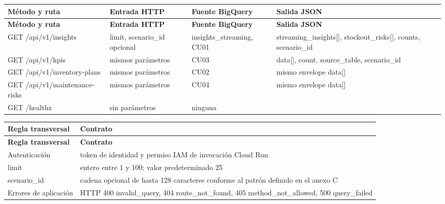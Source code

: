 \documentclass[11pt]{article}
\begin{document}
\begingroup\small
\begin{longtable}{@{}>{\raggedright\arraybackslash}p{}>{\raggedright\arraybackslash}p{}>{\raggedright\arraybackslash}p{}>{\raggedright\arraybackslash}p{}@{}}
\toprule
\textbf{Método y ruta} & \textbf{Entrada HTTP} & \textbf{Fuente BigQuery} & \textbf{Salida JSON} \\
\midrule
\endfirsthead
\toprule
\textbf{Método y ruta} & \textbf{Entrada HTTP} & \textbf{Fuente BigQuery} & \textbf{Salida JSON} \\
\midrule
\endhead
GET /api/\allowbreak{}v1/\allowbreak{}insights & limit, scenario\_\allowbreak{}id opcional & insights\_\allowbreak{}streaming, CU01 & streaming\_\allowbreak{}insights[], stockout\_\allowbreak{}risks[], counts, scenario\_\allowbreak{}id \\
GET /api/\allowbreak{}v1/\allowbreak{}kpis & mismos parámetros & CU03 & data[], count, source\_\allowbreak{}table, scenario\_\allowbreak{}id \\
GET /api/\allowbreak{}v1/\allowbreak{}inventory-plans & mismos parámetros & CU02 & mismo envelope data[] \\
GET /api/\allowbreak{}v1/\allowbreak{}maintenance-risks & mismos parámetros & CU04 & mismo envelope data[] \\
GET /healthz & sin parámetros & ninguna & [''status'':''ok''] \\
\bottomrule
\end{longtable}
\endgroup

\begingroup\small
\begin{longtable}{@{}>{\raggedright\arraybackslash}p{}>{\raggedright\arraybackslash}p{}@{}}
\toprule
\textbf{Regla transversal} & \textbf{Contrato} \\
\midrule
\endfirsthead
\toprule
\textbf{Regla transversal} & \textbf{Contrato} \\
\midrule
\endhead
Autenticación & token de identidad y permiso IAM de invocación Cloud Run \\
limit & entero entre 1 y 100; valor predeterminado 25 \\
scenario\_\allowbreak{}id & cadena opcional de hasta 128 caracteres conforme al patrón definido en el anexo C \\
Errores de aplicación & HTTP 400 invalid\_\allowbreak{}query, 404 route\_\allowbreak{}not\_\allowbreak{}found, 405 method\_\allowbreak{}not\_\allowbreak{}allowed, 500 query\_\allowbreak{}failed \\
\bottomrule
\end{longtable}
\endgroup
\end{document}
